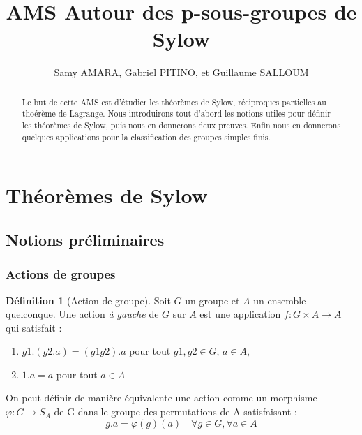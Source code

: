 \documentclass[french]{article}
\title{AMS Autour des p-sous-groupes de Sylow}
\author{Samy AMARA, Gabriel PITINO, et Guillaume SALLOUM}
\date{}
\theoremstyle{definition}
\newtheorem{definition}[subsubsection]{Définition}
\theoremstyle{plain}
\theoremstyle{plain}
\theoremstyle{plain}
\theoremstyle{plain}
\theoremstyle{plain}
\begin{document}
\maketitle
\begin{abstract}
	Le but de cette AMS est d'étudier les théorèmes de Sylow, réciproques partielles au thoérème de Lagrange.
	Nous introduirons tout d'abord les notions utiles pour définir les théorèmes de Sylow, puis nous en donnerons deux preuves. Enfin nous en donnerons quelques applications pour la classification des groupes simples finis.%
\end{abstract}



\tableofcontents
\clearpage

\section{Théorèmes de Sylow}
\subsection{Notions préliminaires}
\subsubsection{Actions de groupes}


\begin{definition}[Action de groupe]
	Soit \( G \) un groupe et \( A \) un ensemble quelconque. Une action \textit{à gauche} de \( G \) sur \( A \) est une application \( f : G \times A \rightarrow A\) qui satisfait :
	\begin{enumerate}[label = (\roman*)]
		\item \(g1.(g2.a) = (g1g2).a \) pour tout \(g1,g2 \in G\), \(a \in A\),
		\item \(1.a = a\) pour tout \(a \in A\)
	\end{enumerate}

	On peut définir de manière équivalente \cite[p. ~43]{dummit2003abstract} une action comme un morphisme \( \varphi : G \rightarrow S_{A} \) de G dans le groupe des permutations de A satisfaisant :
	\begin{equation}
		g.a = \varphi(g)(a) \quad \forall g \in G, \forall a \in A
	\end{equation}
\end{definition}
\end{document}
